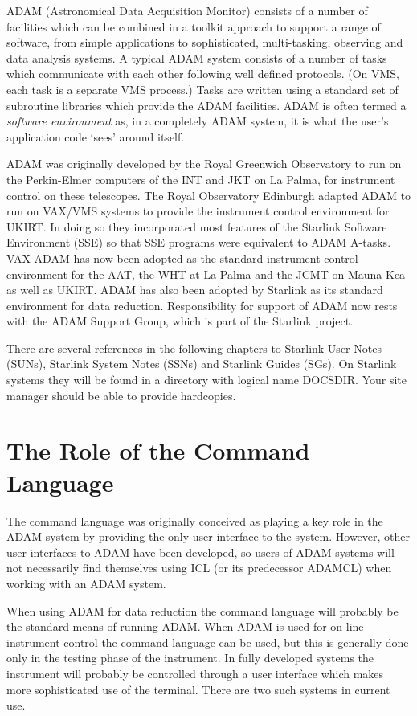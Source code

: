 ADAM (Astronomical Data Acquisition Monitor) consists of a number of facilities
which can be combined in a toolkit approach to support a range of software,
from simple applications to sophisticated, multi-tasking, observing and data
analysis systems.
A typical ADAM system consists of a number of tasks which communicate with each
other following well defined protocols.
(On VMS, each task is a separate VMS process.)
Tasks are written using a standard set of subroutine libraries which provide
the ADAM facilities.
ADAM is often termed a {\em software environment} as, in a completely ADAM
system, it is what the user's application code `sees' around itself.

ADAM was originally developed by the Royal Greenwich Observatory to run on the
Perkin-Elmer computers of the INT and JKT on La Palma, for instrument
control on these telescopes. The Royal Observatory
Edinburgh adapted ADAM to run on VAX/VMS systems to provide the
instrument control environment for UKIRT. In doing so they incorporated
most features of the Starlink Software Environment (SSE) so that SSE programs
were equivalent to ADAM A-tasks. VAX ADAM has now been adopted as the
standard instrument control environment for the AAT, the WHT at La Palma
and the JCMT on Mauna Kea as well as UKIRT. ADAM has also been adopted
by Starlink as its standard environment for data reduction. 
Responsibility for support of ADAM now rests with the ADAM Support Group, 
which is part of the Starlink project.

There are several references in the following chapters to Starlink User Notes
(SUNs), Starlink System Notes (SSNs) and Starlink Guides (SGs).
On Starlink systems they will be found in a directory with logical name 
DOCSDIR. Your site manager should be able to provide hardcopies.

\section{The Role of the Command Language}
The command language was originally conceived as playing a key role
in the ADAM system by providing the only user interface to the system.
However, other user interfaces to ADAM have been developed, so users of
ADAM systems will not necessarily find themselves using ICL (or its predecessor
ADAMCL) when working with an ADAM system.

When using ADAM for data reduction the command language will probably be
the standard means of running ADAM. When ADAM is used for on line instrument
control the command language can be used, but this is generally done only
in the testing phase of the instrument. In fully developed systems the 
instrument will probably be controlled through a user interface
which makes more sophisticated use of the terminal.
There are two such systems in current use.

